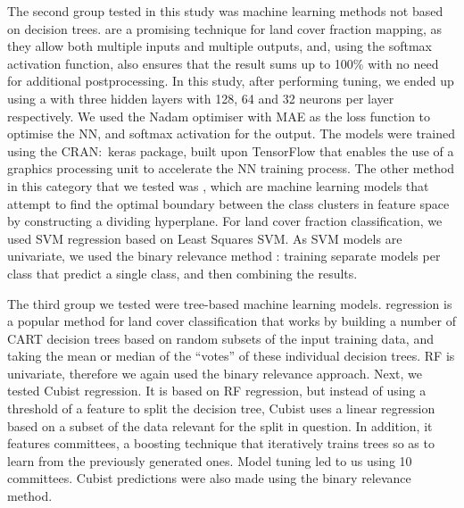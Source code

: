 \documentclass[review,authoryear,3p]{elsarticle}
\newcommand{\cran}[1]{CRAN:~#1}
\begin{document}

The second group tested in this study was machine learning methods not based on decision trees.  are a promising technique for land cover fraction mapping, as they allow both multiple inputs and multiple outputs, and, using the softmax activation function, also ensures that the result sums up to 100\% with no need for additional postprocessing.
In this study, after performing tuning, we ended up using a  with three hidden layers with 128, 64 and 32 neurons per layer respectively.
We used the Nadam optimiser \citep{dozat_incorporating_2016} with \gls{MAE} as the loss function to optimise the \gls{NN}, and softmax activation for the output.
The models were trained using the \cran{keras} package, built upon TensorFlow that enables the use of a graphics processing unit to accelerate the \gls{NN} training process.
The other method in this category that we tested was , which are machine learning models that attempt to find the optimal boundary between the class clusters in feature space by constructing a dividing hyperplane.
For land cover fraction classification, we used \gls{SVM} regression based on Least Squares \gls{SVM}.
As \gls{SVM} models are univariate, we used the binary relevance method \citep{karalas2016br}: training separate models per class that predict a single class, and then combining the results.


The third group we tested were tree-based machine learning models.
 regression is a popular method for land cover classification that works by building a number of \gls{CART} decision trees based on random subsets of the input training data, and taking the mean or median of the ``votes'' of these individual decision trees.
\ac{RF} is univariate, therefore we again used the binary relevance approach.
Next, we tested Cubist regression.
It is based on \gls{RF} regression, but instead of using a threshold of a feature to split the decision tree, Cubist uses a linear regression based on a subset of the data relevant for the split in question.
In addition, it features committees, a boosting technique that iteratively trains trees so as to learn from the previously generated ones.
Model tuning led to us using 10 committees.
Cubist predictions were also made using the binary relevance method.
\end{document}
